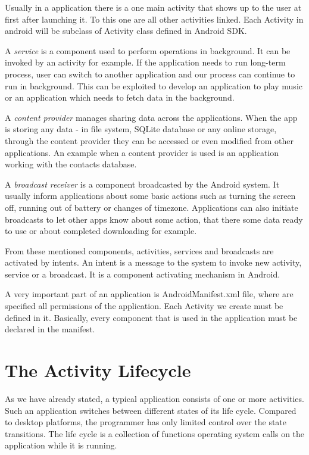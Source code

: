 Usually in a application there is a one main activity that shows up to the user at first after launching it.
To this one are all other activities linked.
Each Activity in android will be subclass of Activity class defined in Android SDK.

A \emph{service} is a component used to perform operations in background.
It can be invoked by an activity for example.
If the application needs to run long-term process, user can switch to another application and our process can continue to run in background.
This can be exploited to develop an application to play music or an application which needs to fetch data in the background.

A \emph{content provider} manages sharing data across the applications.
When the app is storing any data - in file system, SQLite database or any online storage, through the content provider they can be accessed or even modified from other applications.
An example when a content provider is used is an application working with the contacts database.

A \emph{broadcast receiver} is a component broadcasted by the Android system.
It usually inform applications about some basic actions such as turning the screen off, running out of battery or changes of timezone.
Applications can also initiate broadcasts to let other apps know about some action, that there some data ready to use or about completed downloading for example.

From these mentioned components, activities, services and broadcasts are activated by intents.
An intent is a message to the system to invoke new activity, service or a broadcast.
It is a component activating mechanism in Android.

A very important part of an application is AndroidManifest\@.xml file, where are specified all permissions of the application.
Each Activity we create must be defined in it. Basically, every component that is used in the application must be declared in the manifest.


\section{The Activity Lifecycle}
As we have already stated, a typical application consists of one or more activities.
Such an application switches between different states of its life cycle.  
Compared to desktop platforms, the programmer has only limited control over the state transitions. 
The life cycle is a collection of functions operating system calls on the application while it is running.

